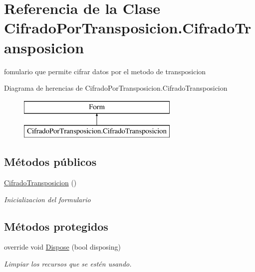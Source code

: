 \hypertarget{class_cifrado_por_transposicion_1_1_cifrado_transposicion}{}\section{Referencia de la Clase Cifrado\+Por\+Transposicion.\+Cifrado\+Transposicion}
\label{class_cifrado_por_transposicion_1_1_cifrado_transposicion}


fomulario que permite cifrar datos por el metodo de transposicion  


Diagrama de herencias de Cifrado\+Por\+Transposicion.\+Cifrado\+Transposicion\begin{figure}[H]
\begin{center}
\leavevmode
\includegraphics[height=2.000000cm]{class_cifrado_por_transposicion_1_1_cifrado_transposicion}
\end{center}
\end{figure}
\subsection*{Métodos públicos}
\begin{DoxyCompactItemize}
\item 
\hyperlink{class_cifrado_por_transposicion_1_1_cifrado_transposicion_a7b54f34e20c0a9a1c2fc23223ba6d250}{Cifrado\+Transposicion} ()
\begin{DoxyCompactList}\small\item\em Inicializacion del formulario \end{DoxyCompactList}\end{DoxyCompactItemize}
\subsection*{Métodos protegidos}
\begin{DoxyCompactItemize}
\item 
override void \hyperlink{class_cifrado_por_transposicion_1_1_cifrado_transposicion_a7072f986d36a15c6fcc7ccfc0f86f3ec}{Dispose} (bool disposing)
\begin{DoxyCompactList}\small\item\em Limpiar los recursos que se estén usando. \end{DoxyCompactList}\end{DoxyCompactItemize}


